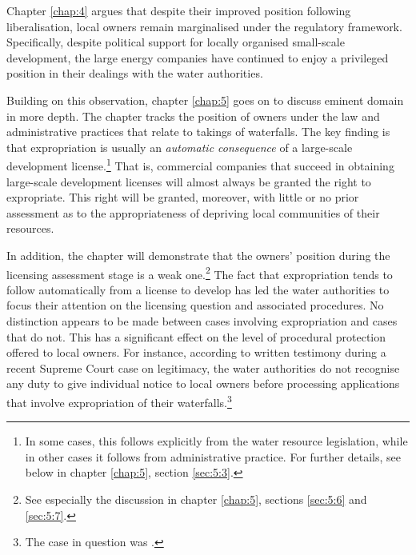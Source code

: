 
Chapter \ref{chap:4} argues that despite their improved position following liberalisation, local owners remain marginalised under the regulatory framework. Specifically, despite political support for locally organised small-scale development, the large energy companies have continued to enjoy a privileged position in their dealings with the water authorities. %

Building on this observation, chapter \ref{chap:5} goes on to discuss eminent domain in more depth. The chapter tracks the position of owners under the law and administrative practices that relate to takings of waterfalls. The key finding is that expropriation is usually an {\it automatic consequence} of a large-scale development license.\footnote{In some cases, this follows explicitly from the water resource legislation, while in other cases it follows from administrative practice. For further details, see below in chapter \ref{chap:5}, section \ref{sec:5:3}.} That is, commercial companies that succeed in obtaining large-scale development licenses will almost always be granted the right to expropriate. This right will be granted, moreover, with little or no prior assessment as to the appropriateness of depriving local communities of their resources.

In addition, the chapter will demonstrate that the owners' position during the licensing assessment stage is a weak one.\footnote{See especially the discussion in chapter \ref{chap:5}, sections \ref{sec:5:6} and \ref{sec:5:7}.} The fact that expropriation tends to follow automatically from a license to develop has led the water authorities to focus their attention on the licensing question and associated procedures. No distinction appears to be made between cases involving expropriation and cases that do not. This has a significant effect on the level of procedural protection offered to local owners. For instance, according to written testimony during a recent Supreme Court case on legitimacy, the water authorities do not recognise any duty to give individual notice to local owners before processing applications that involve expropriation of their waterfalls.\footnote{The case in question was \cite{jorpeland11}.}


